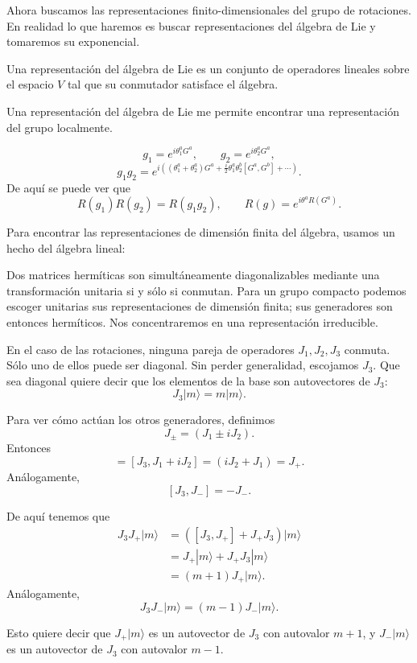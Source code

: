 \documentclass[11pt,a4paper]{article}
\begin{document}
Ahora buscamos las representaciones finito-dimensionales del grupo de rotaciones. En realidad lo que haremos es buscar representaciones del álgebra de Lie y tomaremos su exponencial.

Una representación del álgebra de Lie es un conjunto de operadores lineales sobre el espacio $V$ tal que su conmutador satisface el álgebra.

Una representación del álgebra de Lie me permite encontrar una representación del grupo localmente.

\[
  g_1=e^{i\theta_1^aG^a},
  \qquad
  g_2=e^{i\theta_2^aG^a},
\]
\[
  g_1g_2
  =e^{i\left(
      (\theta_1^a+\theta_2^a)G^a
      +\frac{i}{2}\theta_1^a\theta_2^b[G^a,G^b]
      +\cdots
    \right)}.
\]
De aquí se puede ver que
\[
  R(g_1)R(g_2)=R(g_1g_2),
  \qquad
  R(g)=e^{i\theta^aR(G^a)}.
\]

Para encontrar las representaciones de dimensión finita del álgebra, usamos un hecho del álgebra lineal:

Dos matrices hermíticas son simultáneamente diagonalizables mediante una
transformación unitaria si y sólo si conmutan. Para un grupo compacto
podemos escoger unitarias sus representaciones de dimensión finita;
sus generadores son entonces hermíticos. Nos concentraremos en una
representación irreducible.

En el caso de las rotaciones, ninguna pareja de operadores $J_1,J_2,J_3$ conmuta. Sólo uno de ellos puede ser diagonal. Sin perder generalidad, escojamos $J_3$. Que sea diagonal quiere decir que los elementos de la base son autovectores de $J_3$:
\[
  J_3|m\rangle=m|m\rangle.
\]

Para ver cómo actúan los otros generadores, definimos
\[
  J_\pm=(J_1\pm iJ_2).
\]
Entonces
\begin{equation}
  [J_3,J_+]
  =[J_3,J_1+iJ_2]
   =(iJ_2+J_1)
   =J_+.
\end{equation}
Análogamente,
\[
  [J_3,J_-]=-J_-.
\]

De aquí tenemos que
\begin{align*}
  J_3J_+|m\rangle
  &=([J_3,J_+]+J_+J_3)|m\rangle\\
  &=J_+|m\rangle+J_+J_3|m\rangle\\
  &=(m+1)J_+|m\rangle.
\end{align*}
Análogamente,
\[
  J_3J_-|m\rangle=(m-1)J_-|m\rangle.
\]

Esto quiere decir que $J_+|m\rangle$ es un autovector de $J_3$ con autovalor $m+1$, y $J_-|m\rangle$ es un autovector de $J_3$ con autovalor $m-1$.
\end{document}
